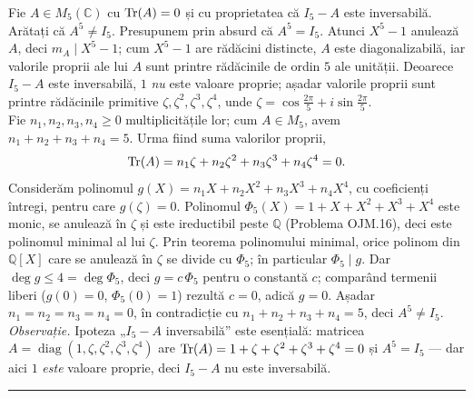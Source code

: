 Fie $A\in M_5(\mathbb{C})$ cu $\operatorname{Tr}(A)=0$ și cu proprietatea că $I_5-A$ este inversabilă. Arătați că $A^5\neq I_5$.
\sol Presupunem prin absurd că $A^5=I_5$. Atunci $X^5-1$ anulează $A$, deci $m_A\mid X^5-1$; cum $X^5-1$ are rădăcini distincte, $A$ este diagonalizabilă, iar valorile proprii ale lui $A$ sunt printre rădăcinile de ordin $5$ ale unității. Deoarece $I_5-A$ este inversabilă, $1$ \emph{nu} este valoare proprie; așadar valorile proprii sunt printre rădăcinile primitive $\zeta,\zeta^2,\zeta^3,\zeta^4$, unde $\zeta=\cos\frac{2\pi}{5}+i\sin\frac{2\pi}{5}$.\\[2pt]
Fie $n_1,n_2,n_3,n_4\ge0$ multiplicitățile lor; cum $A\in M_5$, avem $n_1+n_2+n_3+n_4=5$. Urma fiind suma valorilor proprii,
\[ \operatorname{Tr}(A)=n_1\zeta+n_2\zeta^2+n_3\zeta^3+n_4\zeta^4=0. \]
Considerăm polinomul $g(X)=n_1X+n_2X^2+n_3X^3+n_4X^4$, cu coeficienți întregi, pentru care $g(\zeta)=0$. Polinomul $\Phi_5(X)=1+X+X^2+X^3+X^4$ este monic, se anulează în $\zeta$ și este ireductibil peste $\mathbb{Q}$ (Problema OJM.16), deci este polinomul minimal al lui $\zeta$. Prin teorema polinomului minimal, orice polinom din $\mathbb{Q}[X]$ care se anulează în $\zeta$ se divide cu $\Phi_5$; în particular $\Phi_5\mid g$. Dar $\deg g\le 4=\deg\Phi_5$, deci $g=c\,\Phi_5$ pentru o constantă $c$; comparând termenii liberi ($g(0)=0$, $\Phi_5(0)=1$) rezultă $c=0$, adică $g=0$. Așadar $n_1=n_2=n_3=n_4=0$, în contradicție cu $n_1+n_2+n_3+n_4=5$, deci $A^5\neq I_5$.\\[2pt]
\emph{Observație.} Ipoteza „$I_5-A$ inversabilă'' este esențială: matricea $A=\operatorname{diag}(1,\zeta,\zeta^2,\zeta^3,\zeta^4)$ are $\operatorname{Tr}(A)=1+\zeta+\zeta^2+\zeta^3+\zeta^4=0$ și $A^5=I_5$ --- dar aici $1$ \emph{este} valoare proprie, deci $I_5-A$ nu este inversabilă.
\vspace{1mm}\hrule

